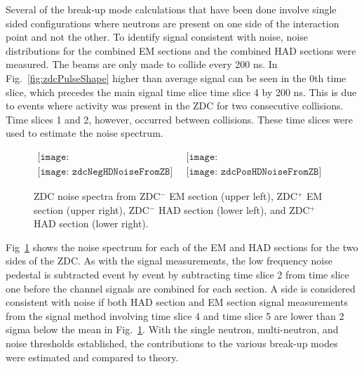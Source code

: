       Several of the break-up mode calculations that have been done involve
        single sided configurations where neutrons are present on one side
        of the interaction point and not the other.
      To identify signal consistent with noise, noise distributions for the 
        combined EM sections and the combined HAD sections were measured.
      The beams are only made to collide every 200 ns. 
      In Fig.~\ref{fig:zdcPulseShape} higher than average signal can be seen
        in the 0th time slice, which precedes the main signal time slice 
        time slice 4 by 200 ns. 
      This is due to events where activity was present in the ZDC for 
        two consecutive collisions.
      Time slices 1 and 2, however, occurred between collisions.
      These time slices were used to estimate the noise spectrum.
      \begin{figure}[!Hhbt]
        \centering
        $ \begin{array}{cc}
          \texttt{[image: zdcNegEMNoiseFromZBNoCor]} & 
          \texttt{[image: zdcPosEMNoiseFromZBNoCor]} \\
          \texttt{[image: zdcNegHDNoiseFromZB]} &
          \texttt{[image: zdcPosHDNoiseFromZB]}
        \end{array} $
        \caption{ZDC noise spectra from ZDC$^{-}$ EM section (upper left), 
          ZDC$^{+}$ EM section (upper right), ZDC$^{-}$ HAD section (lower left), 
          and ZDC$^{+}$ HAD section (lower right).}
        \label{fig:zdcNoiseSpectra}
      \end{figure}

      Fig~\ref{fig:zdcNoiseSpectra} shows the noise spectrum for each of the 
        EM and HAD sections for the two sides of the ZDC. 
      As with the signal measurements, the low frequency noise pedestal is 
        subtracted event by event by subtracting time slice 2 from time slice
        one before the channel signals are combined for each section.
      A side is considered consistent with noise if both HAD section and EM 
        section signal measurements from the signal method involving time slice
        4 and time slice 5 are lower than 2 sigma below the mean in 
        Fig.~\ref{fig:zdcNoiseSpectra}.
      With the single neutron, multi-neutron, and noise thresholds established,
        the contributions to the various break-up modes were estimated and 
        compared to theory. 


